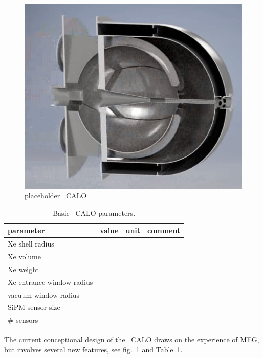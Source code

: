 \begin{figure}[h!]
\centering
\includegraphics[scale=.4]{sections/figures/calo.Xe.png}
\caption{placeholder  \nexp\ CALO }
\label{fig:calo.Xe}
\end{figure}

\begin{table}
\center
\begin{tabular}{llll}
\hline
\hline
 parameter  &  	value		& 	unit		&  comment \\
\hline
Xe shell radius				&		&		&		\\
Xe volume					&		&		&		\\
Xe weight					&		&		&		\\
Xe entrance window radius	&		&		&		\\
vacuum window radius		&		&		&		\\
\hline
SiPM sensor size			&		&		&		\\
\# sensors					&		&		&		\\
\hline
\hline
\end{tabular}
\caption{Basic \nexp\ CALO parameters. }
\label{tab:detpar}
\end{table}
The current conceptional design of the \nexp\ CALO draws on the experience of MEG, but involves several new features, see fig.~\ref{fig:calo.Xe} and Table~\ref{tab:detpar}.


